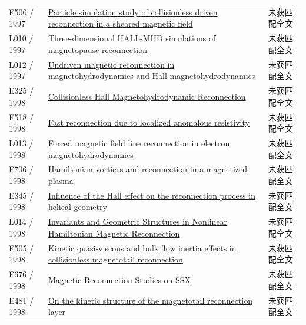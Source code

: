 \begin{longtable}{P{24mm}P{97mm}P{27mm}}
E506 / 1997 & \href{https://doi.org/10.1063/1.872088}{Particle simulation study of collisionless driven reconnection in a sheared magnetic field} & 未获匹配全文\\

L010 / 1997 & \href{https://doi.org/10.1016/s0079-1946(97)00206-1}{Three-dimensional HALL-MHD simulations of magnetopause reconnection} & 未获匹配全文\\

L012 / 1997 & \href{https://doi.org/10.1029/96ja03634}{Undriven magnetic reconnection in magnetohydrodynamics and Hall magnetohydrodynamics} & 未获匹配全文\\

E325 / 1998 & \href{http://ui.adsabs.harvard.edu/abs/1998APS..DPP.K6S43M/abstract}{Collisionless Hall Magnetohydrodynamic Reconnection} & 未获匹配全文\\

E518 / 1998 & \href{https://doi.org/10.1063/1.873046}{Fast reconnection due to localized anomalous resistivity} & 未获匹配全文\\

L013 / 1998 & \href{https://doi.org/10.1063/1.873005}{Forced magnetic field line reconnection in electron magnetohydrodynamics} & 未获匹配全文\\

F706 / 1998 & \href{https://doi.org/10.1017/s0022377898006655}{Hamiltonian vortices and reconnection in a magnetized plasma} & 未获匹配全文\\

E345 / 1998 & \href{http://ui.adsabs.harvard.edu/abs/1998PlPhR..24..929Z/abstract}{Influence of the Hall effect on the reconnection process in helical geometry} & 未获匹配全文\\

L014 / 1998 & \href{https://doi.org/10.1103/physrevlett.80.4430}{Invariants and Geometric Structures in Nonlinear Hamiltonian Magnetic Reconnection} & 未获匹配全文\\

E505 / 1998 & \href{https://doi.org/10.1029/97ja02699}{Kinetic quasi‐viscous and bulk flow inertia effects in collisionless magnetotail reconnection} & 未获匹配全文\\

F676 / 1998 & \href{https://works.swarthmore.edu/theses/680}{Magnetic Reconnection Studies on SSX} & 未获匹配全文\\

E481 / 1998 & \href{https://doi.org/10.1029/98gl52510}{On the kinetic structure of the magnetotail reconnection layer} & 未获匹配全文\\


\end{longtable}
